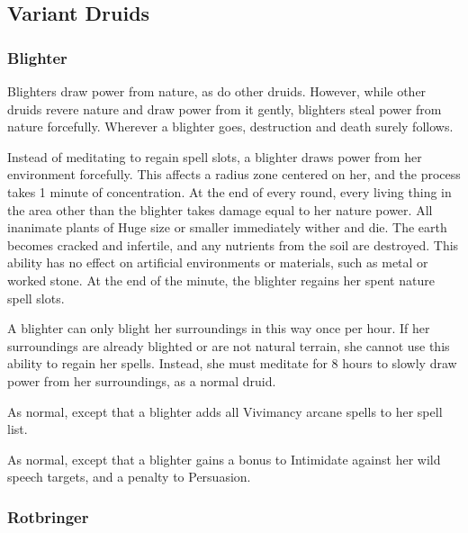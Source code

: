    \subsection{Variant Druids}

        \subsubsection{Blighter}

            Blighters draw power from nature, as do other druids. However, while other druids revere nature and draw power from it gently, blighters steal power from nature forcefully. Wherever a blighter goes, destruction and death surely follows.

             Instead of meditating to regain spell slots, a blighter draws power from her environment forcefully.
            This affects a \areahuge radius zone centered on her, and the process takes 1 minute of concentration.
            At the end of every round, every living thing in the area other than the blighter takes damage equal to her nature power.
            All inanimate plants of Huge size or smaller immediately wither and die.
            The earth becomes cracked and infertile, and any nutrients from the soil are destroyed.
            This ability has no effect on artificial environments or materials, such as metal or worked stone.
            At the end of the minute, the blighter regains her spent nature spell slots.

            A blighter can only blight her surroundings in this way once per hour.
            If her surroundings are already blighted or are not natural terrain, she cannot use this ability to regain her spells.
            Instead, she must meditate for 8 hours to slowly draw power from her surroundings, as a normal druid.

             As normal, except that a blighter adds all Vivimancy arcane spells to her spell list.

             As normal, except that a blighter gains a  bonus to Intimidate against her wild speech targets, and a  penalty to Persuasion.



        \subsubsection{Rotbringer}

